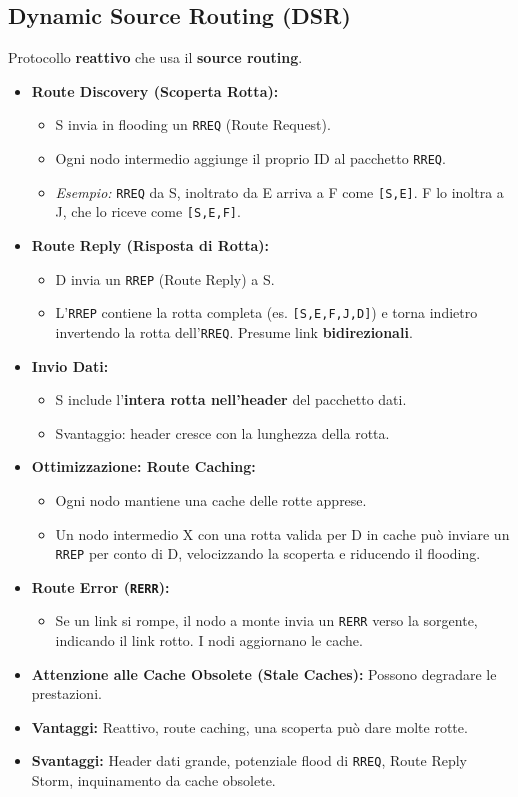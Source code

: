 \subsection{Dynamic Source Routing (DSR)}
Protocollo \textbf{reattivo} che usa il \textbf{source routing}.
\begin{itemize}
    \item \textbf{Route Discovery (Scoperta Rotta):}
    \begin{itemize}
        \item S invia in flooding un \texttt{RREQ} (Route Request).
        \item Ogni nodo intermedio aggiunge il proprio ID al pacchetto \texttt{RREQ}.
        \item \textit{Esempio:} \texttt{RREQ} da S, inoltrato da E arriva a F come \texttt{[S,E]}. F lo inoltra a J, che lo riceve come \texttt{[S,E,F]}.
    \end{itemize}
    \item \textbf{Route Reply (Risposta di Rotta):}
    \begin{itemize}
        \item D invia un \texttt{RREP} (Route Reply) a S.
        \item L'\texttt{RREP} contiene la rotta completa (es. \texttt{[S,E,F,J,D]}) e torna indietro invertendo la rotta dell'\texttt{RREQ}. Presume link \textbf{bidirezionali}.
    \end{itemize}
    \item \textbf{Invio Dati:}
    \begin{itemize}
        \item S include l'\textbf{intera rotta nell'header} del pacchetto dati.
        \item Svantaggio: header cresce con la lunghezza della rotta.
    \end{itemize}
    \item \textbf{Ottimizzazione: Route Caching:}
    \begin{itemize}
        \item Ogni nodo mantiene una cache delle rotte apprese.
        \item Un nodo intermedio X con una rotta valida per D in cache può inviare un \texttt{RREP} per conto di D, velocizzando la scoperta e riducendo il flooding.
    \end{itemize}
    \item \textbf{Route Error (\texttt{RERR}):}
    \begin{itemize}
        \item Se un link si rompe, il nodo a monte invia un \texttt{RERR} verso la sorgente, indicando il link rotto. I nodi aggiornano le cache.
    \end{itemize}
    \item \textbf{Attenzione alle Cache Obsolete (Stale Caches):} Possono degradare le prestazioni.
    \item \textbf{Vantaggi:} Reattivo, route caching, una scoperta può dare molte rotte.
    \item \textbf{Svantaggi:} Header dati grande, potenziale flood di \texttt{RREQ}, Route Reply Storm, inquinamento da cache obsolete.
\end{itemize}

